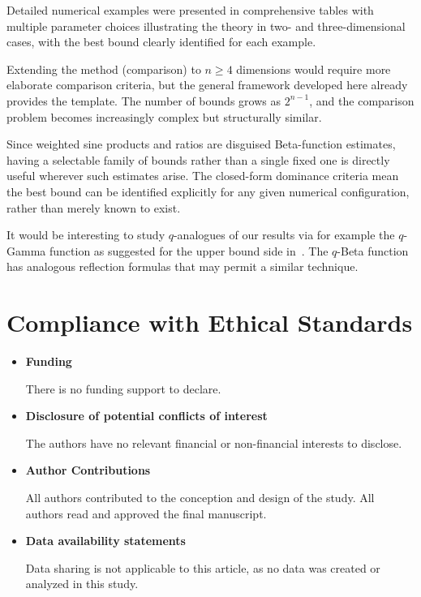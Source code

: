 \documentclass[12pt]{amsart}
\theoremstyle{definition}
\begin{document}
 Detailed numerical examples were presented in comprehensive tables with multiple parameter choices illustrating the theory in two- and three-dimensional cases, with the best bound clearly identified for each example.

Extending the method (comparison) to $n \geq 4$ dimensions would require more elaborate comparison criteria, but the general framework developed here already provides the template. The number of bounds grows as $2^{n-1}$, and the comparison problem becomes increasingly complex but structurally similar.

Since weighted sine products and ratios are disguised Beta-function estimates, having a selectable family of bounds rather than a single fixed one is directly useful wherever such estimates arise.
The closed-form dominance criteria mean the best bound can be identified explicitly for any given numerical configuration, rather than merely known to exist.

It would be interesting to study $q$-analogues of our results via for example the $q$-Gamma function as suggested for the upper bound side in~\cite{MSW2026}. The $q$-Beta function has analogous reflection formulas that may permit a similar technique.

\section{Compliance with Ethical Standards}
\begin{itemize}
\item {\bf Funding}

There is no funding support to declare.

\item {\bf Disclosure of potential conflicts of interest}

The authors have no relevant financial or non-financial interests to disclose.

\item {\bf Author Contributions}

All authors contributed to the conception and design of the study.  All authors read and approved the final manuscript.

\item {\bf Data availability statements}

Data sharing is not applicable to this article, as no data was created or analyzed in this study.
\end{itemize}
\end{document}
